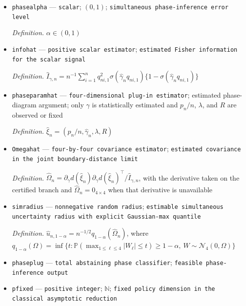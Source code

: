 \documentclass{article}
\begin{document}
\begin{itemize}
  \par\smallskip\noindent\emph{Definition.} \(d(\xi)=\{d_{\mathrm{bal}}(\xi),d_{\mathrm{rad}}(\xi),d_{\mathrm{col}}(\xi),d_0(\xi)\}^\top\)
  \item \texttt{phasealpha} --- \texttt{scalar}; \((0,1)\); \texttt{simultaneous phase-\allowbreak{}inference error level}
  \par\smallskip\noindent\emph{Definition.} \(\alpha\in(0,1)\)
  \item \texttt{infohat} --- \texttt{positive scalar estimator}; \texttt{estimated Fisher information for the scalar signal}
  \par\smallskip\noindent\emph{Definition.} \(\widehat I_{\gamma,n}=n^{-1}\sum_{i=1}^{n}q_{ni,1}^2\sigma(\widehat\gamma_nq_{ni,1})\{1-\sigma(\widehat\gamma_nq_{ni,1})\}\)
  \item \texttt{phaseparamhat} --- \texttt{four-\allowbreak{}dimensional plug-\allowbreak{}in estimator}; estimated phase-diagram argument; only \(\gamma\) is statistically estimated and \(p_n/n\), \(\lambda\), and \(R\) are observed or fixed
  \par\smallskip\noindent\emph{Definition.} \(\widehat\xi_n=(p_n/n,\widehat\gamma_n,\lambda,R)\)
  \item \texttt{Omegahat} --- \texttt{four-\allowbreak{}by-\allowbreak{}four covariance estimator}; \texttt{estimated covariance in the joint boundary-\allowbreak{}distance limit}
  \par\smallskip\noindent\emph{Definition.} \(\widehat\Omega_n=\partial_\gamma d(\widehat\xi_n)\partial_\gamma d(\widehat\xi_n)^\top/\widehat I_{\gamma,n}\), with the derivative taken on the certified branch and \(\widehat\Omega_n=0_{4\times4}\) when that derivative is unavailable
  \item \texttt{simradius} --- \texttt{nonnegative random radius}; \texttt{estimable simultaneous uncertainty radius with explicit Gaussian-\allowbreak{}max quantile}
  \par\smallskip\noindent\emph{Definition.} \(\widehat u_{n,1-\alpha}=n^{-1/2}q_{1-\alpha}(\widehat\Omega_n)\), where \(q_{1-\alpha}(\Omega)=\inf\{t:\mathbb P(\max_{1\le\ell\le4}|W_\ell|\le t)\ge1-\alpha,\ W\sim\mathcal N_4(0,\Omega)\}\)
  \item \texttt{phaseplug} --- \texttt{total abstaining phase classifier}; \texttt{feasible phase-\allowbreak{}inference output}
  \item \texttt{pfixed} --- \texttt{positive integer}; \(\mathbb N\); \texttt{fixed policy dimension in the classical asymptotic reduction}

\end{itemize}
\end{document}
